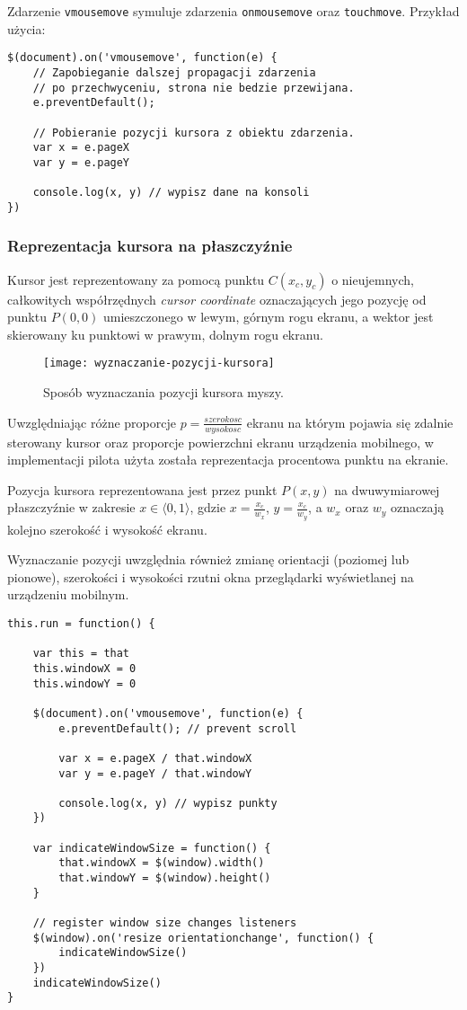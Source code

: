 Zdarzenie \lstinline{vmousemove} symuluje zdarzenia \lstinline{onmousemove} oraz \lstinline{touchmove}. Przykład użycia:

\lstset{language=JavaScript}
\begin{lstlisting}
$(document).on('vmousemove', function(e) {
	// Zapobieganie dalszej propagacji zdarzenia
	// po przechwyceniu, strona nie bedzie przewijana.
	e.preventDefault();
	
	// Pobieranie pozycji kursora z obiektu zdarzenia.
	var x = e.pageX
	var y = e.pageY
	
	console.log(x, y) // wypisz dane na konsoli
})
\end{lstlisting}

\subsubsection{Reprezentacja kursora na płaszczyźnie}

Kursor jest reprezentowany za pomocą punktu \(C(x_{c}, y_{c})\) o nieujemnych, całkowitych współrzędnych \emph{cursor coordinate} oznaczających jego pozycję od punktu \(P(0, 0)\) umieszczonego w lewym, górnym rogu ekranu, a wektor jest skierowany ku punktowi w prawym, dolnym rogu ekranu.

\begin{figure}[h!]
  \caption{Sposób wyznaczania pozycji kursora myszy.}
  \centering
    \texttt{[image: wyznaczanie-pozycji-kursora]}
\end{figure}

Uwzględniając różne proporcje \(p = \frac{szerokosc}{wysokosc}\) ekranu na którym pojawia się zdalnie sterowany kursor oraz proporcje powierzchni ekranu urządzenia mobilnego, w implementacji pilota użyta została reprezentacja procentowa punktu na ekranie.

Pozycja kursora reprezentowana jest przez punkt \(P(x, y)\) na dwuwymiarowej płaszczyźnie w zakresie \( x\in \langle0, 1\rangle \), gdzie \(x = \frac{x_{c}}{w_{x}}\), \(y = \frac{x_{c}}{w_{y}}\), a \(w_{x}\) oraz \(w_{y}\) oznaczają kolejno szerokość i wysokość ekranu.

Wyznaczanie pozycji uwzględnia również zmianę orientacji (poziomej lub pionowe), szerokości i wysokości rzutni okna przeglądarki wyświetlanej na urządzeniu mobilnym.

\lstset{language=JavaScript}
\begin{lstlisting}
this.run = function() {
	
	var this = that
	this.windowX = 0
	this.windowY = 0
	
	$(document).on('vmousemove', function(e) {
		e.preventDefault(); // prevent scroll
		
		var x = e.pageX / that.windowX
		var y = e.pageY / that.windowY
		
		console.log(x, y) // wypisz punkty
	})
	
	var indicateWindowSize = function() {
		that.windowX = $(window).width()
		that.windowY = $(window).height()
	}
	
	// register window size changes listeners
	$(window).on('resize orientationchange', function() {
		indicateWindowSize()
	})
	indicateWindowSize()
}
\end{lstlisting}

